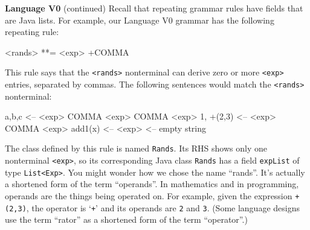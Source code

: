 \begin{minipage}[t]{\sw}
\slidenumber
\LARGE
{\bf Language V0} (continued)\exx
Recall that repeating grammar rules
have fields that are Java lists.
For example, our Language V0 grammar has the following repeating rule:
\begin{qv}
<rands> **= <exp> +COMMA
\end{qv}
This rule says that the \verb'<rands>' nonterminal
can derive zero or more \verb'<exp>' entries,
separated by commas.
The following sentences would match the \verb'<rands>' nonterminal:
\begin{qv}
a,b,c     <-- <exp> COMMA <exp> COMMA <exp>
1, +(2,3) <-- <exp> COMMA <exp>
add1(x)   <-- <exp>
          <-- empty string
\end{qv}
The class defined by this rule is named \verb'Rands'.
Its RHS shows only one nonterminal \verb'<exp>',
so its corresponding Java class \verb'Rands'
has a field \verb'expList' of type \verb'List<Exp>'.\exx
You might wonder how we chose the name ``rands''.
It's actually a shortened form of the term ``operands''.
In mathematics and in programming,
operands are the things being operated on.
For example, given the expression \verb'+(2,3)',
the operator is `\verb'+'' and its operands are \verb'2' and \verb'3'.
(Some language designs use the term ``rator''
as a shortened form of the term ``operator''.)
\end{minipage}
\clearpage
